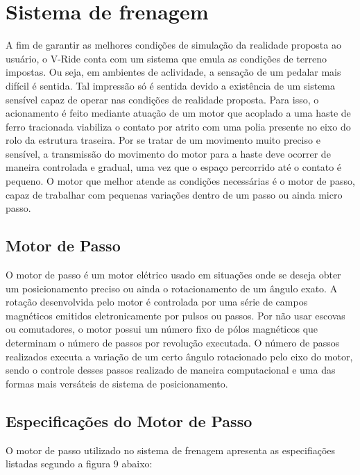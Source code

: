     \section{Sistema de frenagem }  
 A fim de garantir as melhores condições de simulação da realidade proposta ao usuário, o V-Ride conta com um sistema que emula as condições de terreno impostas. Ou seja, em ambientes de aclividade, a sensação de um pedalar mais difícil é sentida. Tal impressão só é sentida devido a existência de um sistema sensível capaz de operar nas condições de realidade proposta.
Para isso, o acionamento é feito mediante atuação de um motor que acoplado a uma haste de ferro tracionada viabiliza o contato por atrito com uma polia presente no eixo do rolo da estrutura traseira. Por se tratar de um movimento muito preciso e sensível, a transmissão do movimento do motor para a haste deve ocorrer de maneira controlada e gradual, uma vez que o espaço percorrido até o contato é pequeno. O motor que melhor atende as condições necessárias é o motor de passo, capaz de trabalhar com pequenas variações dentro de um passo ou ainda micro passo. 

  \subsection{Motor de Passo }  
          O motor de passo é um motor elétrico usado em situações onde se deseja obter um posicionamento preciso ou ainda o rotacionamento de um ângulo exato. A rotação desenvolvida pelo motor é controlada por uma série de campos magnéticos emitidos eletronicamente por pulsos ou passos. Por não usar escovas ou comutadores, o motor possui um número fixo de pólos magnéticos que determinam o número de passos por revolução executada.  O número de passos realizados executa a variação de um certo ângulo rotacionado pelo eixo do motor, sendo o controle desses passos realizado de maneira computacional e uma das formas mais versáteis de sistema de posicionamento. 
    \subsection{Especificações do Motor de Passo }  
 O motor de passo utilizado no sistema de frenagem apresenta as especifiações listadas segundo a figura 9 abaixo: 
                                       
